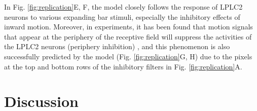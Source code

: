 \documentclass[pdftex,9pt,lineno]{elife}
\begin{document}
In Fig. \ref{fig:replication}E, F, the model closely follows the response of LPLC2 neurons to various expanding bar stimuli, especially the inhibitory effects of inward motion. Moreover, in experiments, it has been found that motion signals that appear at the periphery of the receptive field will suppress the activities of the LPLC2 neurons (periphery inhibition) \citep{klapoetke2017ultra}, and this phenomenon is also successfully predicted by the model (Fig. \ref{fig:replication}G, H) due to the pixels at the top and bottom rows of the inhibitory filters in Fig. \ref{fig:replication}A.


\section{Discussion}







\end{document}
